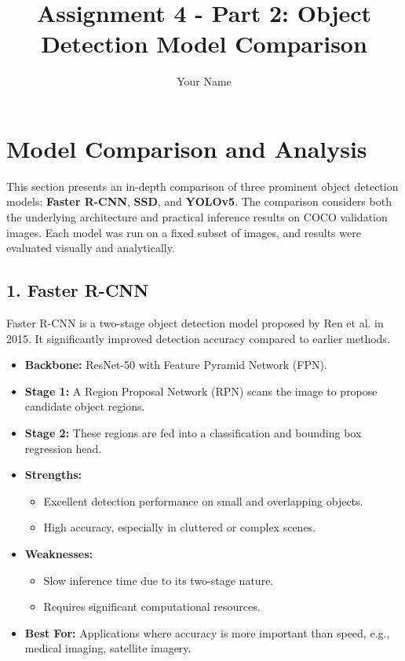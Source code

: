 \documentclass[12pt]{article}
\title{Assignment 4 - Part 2: Object Detection Model Comparison}
\author{Your Name}
\date{}
\begin{document}
\maketitle

\section*{Model Comparison and Analysis}

This section presents an in-depth comparison of three prominent object detection models: \textbf{Faster R-CNN}, \textbf{SSD}, and \textbf{YOLOv5}. The comparison considers both the underlying architecture and practical inference results on COCO validation images. Each model was run on a fixed subset of images, and results were evaluated visually and analytically.

\subsection*{1. Faster R-CNN}
Faster R-CNN is a two-stage object detection model proposed by Ren et al. in 2015. It significantly improved detection accuracy compared to earlier methods.

\begin{itemize}
    \item \textbf{Backbone:} ResNet-50 with Feature Pyramid Network (FPN).
    \item \textbf{Stage 1:} A Region Proposal Network (RPN) scans the image to propose candidate object regions.
    \item \textbf{Stage 2:} These regions are fed into a classification and bounding box regression head.
    \item \textbf{Strengths:} 
    \begin{itemize}
        \item Excellent detection performance on small and overlapping objects.
        \item High accuracy, especially in cluttered or complex scenes.
    \end{itemize}
    \item \textbf{Weaknesses:}
    \begin{itemize}
        \item Slow inference time due to its two-stage nature.
        \item Requires significant computational resources.
    \end{itemize}
    \item \textbf{Best For:} Applications where accuracy is more important than speed, e.g., medical imaging, satellite imagery.
\end{itemize}
\end{document}
